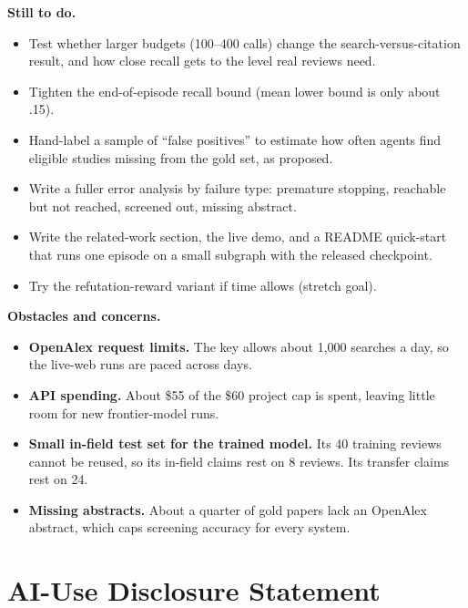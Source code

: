 \documentclass{article} %
\begin{document}
\textbf{Still to do.}
\begin{itemize}
\item Test whether larger budgets (100--400 calls) change the search-versus-citation result, and
  how close recall gets to the level real reviews need.
\item Tighten the end-of-episode recall bound (mean lower bound is only about .15).
\item Hand-label a sample of ``false positives'' to estimate how often agents find eligible
  studies missing from the gold set, as proposed.
\item Write a fuller error analysis by failure type: premature stopping, reachable but not
  reached, screened out, missing abstract.
\item Write the related-work section, the live demo, and a README quick-start that runs one
  episode on a small subgraph with the released checkpoint.
\item Try the refutation-reward variant if time allows (stretch goal).
\end{itemize}

\textbf{Obstacles and concerns.}
\begin{itemize}
\item \textbf{OpenAlex request limits.} The key allows about 1{,}000 searches a day, so the
  live-web runs are paced across days.
\item \textbf{API spending.} About \$55 of the \$60 project cap is spent, leaving little room for new
  frontier-model runs.
\item \textbf{Small in-field test set for the trained model.} Its 40 training reviews cannot be
  reused, so its in-field claims rest on 8 reviews. Its transfer claims rest on 24.
\item \textbf{Missing abstracts.} About a quarter of gold papers lack an OpenAlex abstract,
  which caps screening accuracy for every system.
\end{itemize}




\appendix
\section{AI-Use Disclosure Statement}
\end{document}
